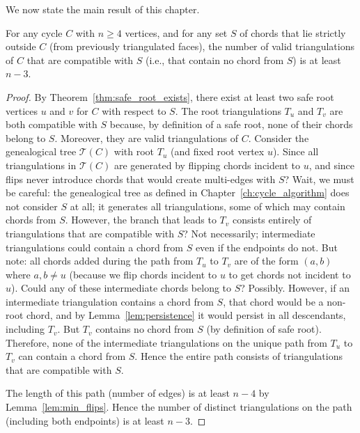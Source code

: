 We now state the main result of this chapter.

\begin{theorem}
    \label{thm:lower_bound}
    For any cycle \(C\) with \(n \ge 4\) vertices, and for any set \(S\) of chords that lie strictly outside \(C\) (from previously triangulated faces), the number of valid triangulations of \(C\) that are compatible with \(S\) (i.e., that contain no chord from \(S\)) is at least \(n-3\).
\end{theorem}

\begin{proof}
    By Theorem~\ref{thm:safe_root_exists}, there exist at least two safe root vertices \(u\) and \(v\) for \(C\) with respect to \(S\). 
    The root triangulations \(T_u\) and \(T_v\) are both compatible with \(S\) because, by definition of a safe root, none of their chords belong to \(S\). 
    Moreover, they are valid triangulations of \(C\). 
    Consider the genealogical tree \(\mathcal{T}(C)\) with root \(T_u\) (and fixed root vertex \(u\)). 
    Since all triangulations in \(\mathcal{T}(C)\) are generated by flipping chords incident to \(u\), and since flips never introduce chords that would create multi-edges with \(S\)? Wait, we must be careful: the genealogical tree as defined in Chapter~\ref{ch:cycle_algorithm} does not consider \(S\) at all; it generates all triangulations, some of which may contain chords from \(S\). 
    However, the branch that leads to \(T_v\) consists entirely of triangulations that are compatible with \(S\)? Not necessarily; intermediate triangulations could contain a chord from \(S\) even if the endpoints do not. 
    But note: all chords added during the path from \(T_u\) to \(T_v\) are of the form \((a, b)\) where \(a, b \neq u\) (because we flip chords incident to \(u\) to get chords not incident to \(u\)). 
    Could any of these intermediate chords belong to \(S\)? Possibly. 
    However, if an intermediate triangulation contains a chord from \(S\), that chord would be a non-root chord, and by Lemma~\ref{lem:persistence} it would persist in all descendants, including \(T_v\). 
    But \(T_v\) contains no chord from \(S\) (by definition of safe root). 
    Therefore, none of the intermediate triangulations on the unique path from \(T_u\) to \(T_v\) can contain a chord from \(S\). 
    Hence the entire path consists of triangulations that are compatible with \(S\).

    The length of this path (number of edges) is at least \(n-4\) by Lemma~\ref{lem:min_flips}. 
    Hence the number of distinct triangulations on the path (including both endpoints) is at least \(n-3\).
\end{proof}

